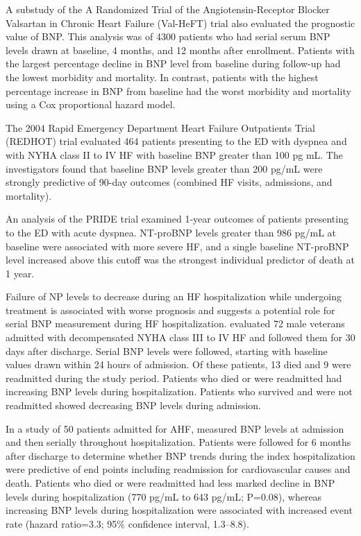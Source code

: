 \documentclass[14pt,a4paper,onecolumn]{extarticle}
\begin{document}
A substudy of the A Randomized Trial of the Angiotensin-Receptor Blocker Valsartan in Chronic Heart Failure (Val-HeFT) trial also evaluated the prognostic value of BNP. This analysis was of 4300 patients who had serial serum BNP levels drawn at baseline, 4 months, and 12 months after enrollment. Patients with the largest percentage decline in BNP level from baseline during follow-up had the lowest morbidity and mortality. In contrast, patients with the highest percentage increase in BNP from baseline had the worst morbidity and mortality using a Cox proportional hazard model. \citep{Anand2003} %

The 2004 Rapid Emergency Department Heart Failure Outpatients Trial (REDHOT) trial evaluated 464 patients presenting to the ED with dyspnea and with NYHA class II to IV HF with baseline BNP greater than 100 pg mL. The investigators found that baseline BNP levels greater than 200 pg/mL were strongly predictive of 90-day outcomes (combined HF visits, admissions, and mortality). \citep{Maisel2004} %

An analysis of the PRIDE trial examined 1-year outcomes of patients presenting to the ED with acute dyspnea. NT-proBNP levels greater than 986 pg/mL at baseline were associated with more severe HF, and a single baseline NT-proBNP level increased above this cutoff was the strongest individual predictor of death at 1 year. \citep{Januzzi2006b} %

Failure of NP levels to decrease during an HF hospitalization while undergoing treatment is associated with worse prognosis and suggests a potential role for serial BNP measurement during HF hospitalization. \citep{Cheng2001} evaluated 72 male veterans admitted with decompensated NYHA class III to IV HF and followed them for 30 days after discharge. Serial BNP levels were followed, starting with baseline values drawn within 24 hours of admission. Of these patients, 13 died and 9 were readmitted during the study period. Patients who died or were readmitted had increasing BNP levels during hospitalization. Patients who survived and were not readmitted showed decreasing BNP levels during admission. \citep{Cheng2001} %

In a study of 50 patients admitted for AHF, \citep{Bettencourt2002} measured BNP levels at admission and then serially throughout hospitalization. Patients were followed for 6 months after discharge to determine whether BNP trends during the index hospitalization were predictive of end points including readmission for cardiovascular causes and death. Patients who died or were readmitted had less marked decline in BNP levels during hospitalization (770  pg/mL to 643  pg/mL; P=0.08), whereas increasing BNP levels during hospitalization were associated with increased event rate (hazard ratio=3.3; 95\% confidence interval, 1.3–8.8). %
\end{document}
